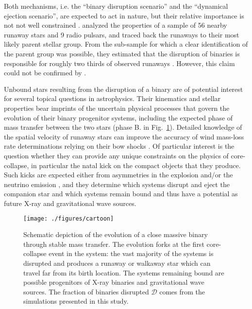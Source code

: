 \documentclass{aa}
\DeclareRobustCommand{\Figref}[1]{Fig.~\ref{#1}}
\begin{document}
Both mechanisms, i.e. the ``binary
disruption scenario'' and the ``dynamical ejection scenario'', are
expected to act in nature, but their relative importance is not not well
constrained \citep[e.g.,][]{hoogerwerf:00,hoogerwerf:01,guseinov:05}.
\citet{hoogerwerf:01} analyzed the properties of a sample of 56 nearby
runaway stars and 9 radio pulsars, and traced back the runaways to
their most likely parent stellar group. From the sub-sample for which a
clear identification of the parent group was possible, they estimated that the disruption of binaries is
responsible for roughly two thirds of observed runaways \citep[see
also][]{gies:86, gies:87, stone:91, hoogerwerf:00, dincel:15,
  boubert:17b}. However, this claim could not be confirmed by
\cite{jilinski:10}.

Unbound stars resulting from the disruption of a binary are of
potential interest for several topical questions in
astrophysics. Their kinematics and stellar properties bear imprints of the uncertain physical processes that govern the evolution of their
binary progenitor systems, including the expected phase of mass
transfer between the two stars (phase B. in
\Figref{fig:cartoon}). Detailed knowledge of the spatial velocity of
runaway stars can improve the accuracy of wind mass-loss rate
determinations relying on their bow shocks \citep[e.g.][]{gull:79,
  kobulnicky:18}. Of particular interest is the
question whether they can provide any unique constraints on the physics of
core-collapse, in particular the natal kick on the compact objects
that they produce. Such kicks are expected either from asymmetries in
the explosion and/or the neutrino emission
\citep[][]{shklovskii:70,kusenko:96,fryer:04,socrates:05,wongwathanarat:13,
  janka:13,janka:17}, and they determine which systems disrupt and
eject the companion star and which systems remain bound and thus have a
potential as future X-ray and gravitational wave sources. 

\begin{figure}[tbp]
  \centering
  \texttt{[image: ./figures/cartoon]}
  \caption{Schematic depiction of the evolution of a close massive
    binary through stable mass transfer. The
    evolution forks at the first core-collapse event in the system: the vast
  majority of the systems is disrupted and produces a runaway or
  walkaway star which can travel far from its birth location. The
  systems remaining bound are possible progenitors of X-ray binaries
  and gravitational wave sources. The fraction of binaries disrupted
  $\mathcal{D}$ comes from the simulations presented in this study.
}
  \label{fig:cartoon}
\end{figure}
\end{document}
